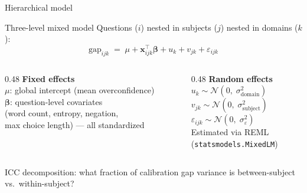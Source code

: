 \documentclass[aspectratio=169,11pt]{beamer}
\begin{document}
\begin{frame}{Hierarchical model}
\begin{block}{Three-level mixed model}
  Questions ($i$) nested in subjects ($j$) nested in domains ($k$):
  \vspace{0.3em}
  \[
    \mathrm{gap}_{ijk} \;=\; \mu + \mathbf{x}_{ijk}^\top \boldsymbol{\beta}
      + u_k + v_{jk} + \varepsilon_{ijk}
  \]
\end{block}

\vspace{0.5em}
\begin{columns}[T]
  \begin{column}{0.48\textwidth}
    \textbf{Fixed effects}\\[0.3em]
    \small
    $\mu$: global intercept (mean overconfidence)\\[0.2em]
    $\boldsymbol{\beta}$: question-level covariates\\
    \quad (word count, entropy, negation,\\
    \quad max choice length) — all standardized
  \end{column}
  \begin{column}{0.48\textwidth}
    \textbf{Random effects}\\[0.3em]
    \small
    $u_k \sim \mathcal{N}(0,\;\sigma^2_{\text{domain}})$\\[0.2em]
    $v_{jk} \sim \mathcal{N}(0,\;\sigma^2_{\text{subject}})$\\[0.2em]
    $\varepsilon_{ijk} \sim \mathcal{N}(0,\;\sigma^2_\varepsilon)$\\[0.5em]
    Estimated via REML\\
    (\texttt{statsmodels.MixedLM})
  \end{column}
\end{columns}

\vspace{0.8em}
{\small\color{mgray}
  ICC decomposition: what fraction of calibration gap variance is between-subject vs.\ within-subject?}
\end{frame}
\end{document}
